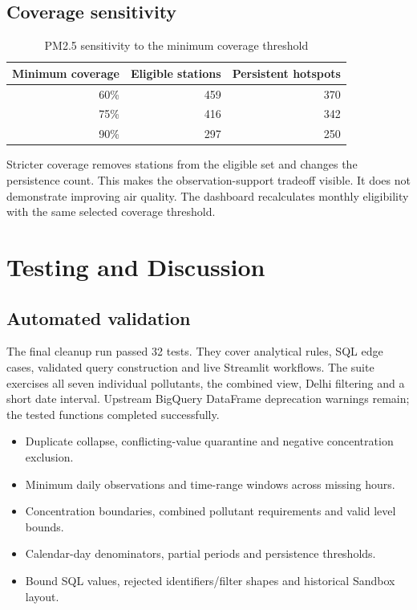 \documentclass[11pt,a4paper]{article}
\begin{document}
\subsection{Coverage sensitivity}
\begin{table}[H]\centering\caption{PM2.5 sensitivity to the minimum coverage threshold}
\begin{tabular}{rrr}\toprule
Minimum coverage & Eligible stations & Persistent hotspots\\\midrule
60\% & 459 & 370\\
75\% & 416 & 342\\
90\% & 297 & 250\\\bottomrule
\end{tabular}\end{table}

Stricter coverage removes stations from the eligible set and changes the persistence count. This makes the observation-support tradeoff visible. It does not demonstrate improving air quality. The dashboard recalculates monthly eligibility with the same selected coverage threshold.

\newpage
\section{Testing and Discussion}
\subsection{Automated validation}
The final cleanup run passed 32 tests. They cover analytical rules, SQL edge cases, validated query construction and live Streamlit workflows. The suite exercises all seven individual pollutants, the combined view, Delhi filtering and a short date interval. Upstream BigQuery DataFrame deprecation warnings remain; the tested functions completed successfully.

\begin{itemize}
\item Duplicate collapse, conflicting-value quarantine and negative concentration exclusion.
\item Minimum daily observations and time-range windows across missing hours.
\item Concentration boundaries, combined pollutant requirements and valid level bounds.
\item Calendar-day denominators, partial periods and persistence thresholds.
\item Bound SQL values, rejected identifiers/filter shapes and historical Sandbox layout.
\end{itemize}
\end{document}
